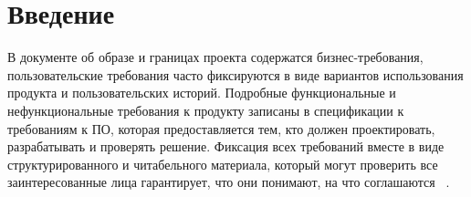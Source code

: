 \chapter*{Введение}
\label{ch:intro}

В документе об образе и границах проекта содержатся бизнес-требования, пользовательские требования часто фиксируются в
виде вариантов использования продукта и пользовательских историй.
Подробные функциональные и нефункциональные требования к продукту записаны в спецификации к требованиям к ПО,
которая предоставляется тем, кто должен проектировать, разрабатывать и проверять решение.
Фиксация всех требований вместе в виде структурированного и читабельного материала, который могут проверить
все заинтересованные лица гарантирует, что они понимают, на что соглашаются ~\cite{vigers}.
\endinput
